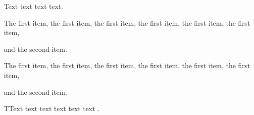 Text text text text.

\begin{listi}
	\item The first item, the first item, the first item, the first item, the first item, the first item,
	\item and the second item.
\end{listi}

\begin{lista}
	\item The first item, the first item, the first item, the first item, the first item, the first item, 
	\item and the second item.
\end{lista}

TText text text text text text \citet{Blomstrom2003}. 